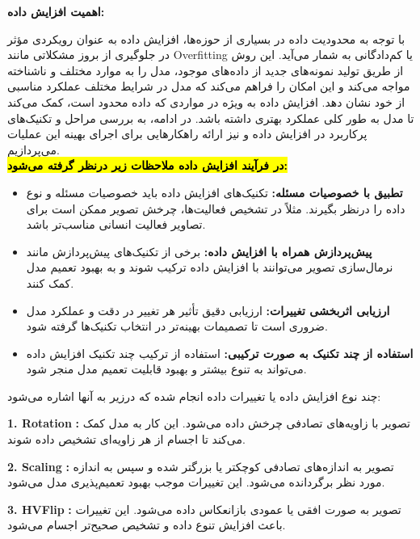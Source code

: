  \textbf{اهمیت افزایش داده:}

 با توجه به محدودیت داده در بسیاری از حوزه‌ها، افزایش داده به عنوان رویکردی مؤثر در جلوگیری از بروز مشکلاتی مانند %
\gls{Overfitting}
  یا کم‌دادگانی به شمار می‌آید. این روش از طریق تولید نمونه‌های جدید از داده‌های موجود، مدل را به موارد مختلف و ناشناخته مواجه می‌کند و این امکان را فراهم می‌کند که مدل در شرایط مختلف عملکرد مناسبی از خود نشان دهد. افزایش داده به ویژه در مواردی که داده محدود است، کمک می‌کند تا مدل به طور کلی عملکرد بهتری داشته باشد. در ادامه، به بررسی مراحل و تکنیک‌های پرکاربرد در افزایش داده و نیز ارائه راهکارهایی برای اجرای بهینه این عملیات می‌پردازیم.\\
  
 \textbf{\hl{در فرآیند افزایش داده ملاحظات زیر درنظر گرفته می‌شود:}}
\begin{itemize}
	\item \textbf{تطبیق با خصوصیات مسئله:}
	تکنیک‌های افزایش داده باید خصوصیات مسئله و نوع داده را درنظر بگیرند. مثلاً در تشخیص فعالیت‌ها، چرخش تصویر ممکن است برای تصاویر فعالیت انسانی مناسب‌تر باشد.
	
	\item \textbf{پیش‌پردازش همراه با افزایش داده:}
	برخی از تکنیک‌های پیش‌پردازش مانند نرمال‌سازی تصویر می‌توانند با افزایش داده ترکیب شوند و به بهبود تعمیم مدل کمک کنند.
	
	\item \textbf{ارزیابی اثربخشی تغییرات:}
	ارزیابی دقیق تأثیر هر تغییر در دقت و عملکرد مدل ضروری است تا تصمیمات بهینه‌تر در انتخاب تکنیک‌ها گرفته شود.
	
	\item \textbf{استفاده از چند تکنیک به صورت ترکیبی:}
	استفاده از ترکیب چند تکنیک افزایش داده می‌تواند به تنوع بیشتر و بهبود قابلیت تعمیم مدل منجر شود.
\end{itemize}

چند نوع افزایش داده یا تغییرات داده انجام شده که درزیر به آنها اشاره می‌شود:

\textbf{1. \gls{Rotation}}
\textbf{:}
تصویر با زاویه‌های تصادفی چرخش داده می‌شود. این کار به مدل کمک می‌کند تا اجسام از هر زاویه‌ای تشخیص داده شوند.

\textbf{2. \gls{Scaling}}
\textbf{:}
تصویر به اندازه‌های تصادفی کوچکتر یا بزرگتر شده و سپس به اندازه مورد نظر برگردانده می‌شود. این تغییرات موجب بهبود تعمیم‌پذیری مدل می‌شود.

\textbf{3.  \gls{HVFlip}}
\textbf{:}
تصویر به صورت افقی یا عمودی بازانعکاس داده می‌شود. این تغییرات باعث افزایش تنوع داده و تشخیص صحیح‌تر اجسام می‌شود.


